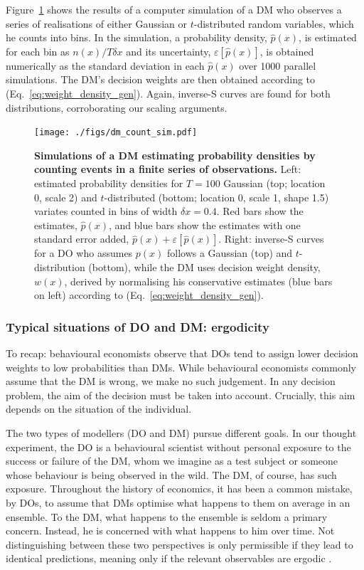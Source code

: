 \documentclass[a4paper, 12pt]{article}
\newcommand{\eref}[1]{(Eq.~\ref{eq:#1})}
\newcommand{\flabel}[1]{\label{fig:#1}}
\newcommand{\Fref}[1]{Figure~\ref{fig:#1}}
\newcommand{\err}[1]{\varepsilon\left[#1\right]}
\newcommand{\phat}{\hat{p}}
\begin{document}
\Fref{dm_count_sim} shows the results of a computer simulation of a DM who observes a series of realisations of either Gaussian or $t$-distributed random variables, which he counts into bins. In the simulation, a probability density, $\phat(x)$, is estimated for each bin as $n(x)/T\delta x$ and its uncertainty, $\err{\phat(x)}$, is obtained numerically as the standard deviation in each $\phat(x)$ over 1000 parallel simulations. The DM's decision weights are then obtained according to \eref{weight_density_gen}. Again, inverse-S curves are found for both distributions, corroborating our scaling arguments.
\begin{figure}[!htb]
\centering
\texttt{[image: ./figs/dm\_count\_sim.pdf]}
\caption{\textbf{Simulations of a DM estimating probability densities by counting events in a finite series of observations.} Left: estimated probability densities for $T=100$ Gaussian (top; location 0, scale 2) and $t$-distributed (bottom; location 0, scale 1, shape 1.5) variates counted in bins of width $\delta x=0.4$. Red bars show the estimates, $\phat(x)$, and blue bars show the estimates with one standard error added, $\phat(x)+\err{\phat(x)}$. Right: inverse-S curves for a DO who assumes $p(x)$ follows a Gaussian (top) and $t$-distribution (bottom), while the DM uses decision weight density, $w(x)$, derived by normalising his conservative estimates (blue bars on left) according to \eref{weight_density_gen}.
}
\flabel{dm_count_sim}
\end{figure}

\subsubsection{Typical situations of DO and DM: ergodicity}
To recap: behavioural economists observe that DOs tend to assign lower decision weights to low probabilities than DMs. While behavioural economists commonly assume that the DM is wrong, we make no such judgement. In any decision problem, the aim of the decision must be taken into account. Crucially, this aim depends on the situation of the individual.

The two types of modellers (DO and DM) pursue different goals. In our thought experiment, the DO is a behavioural scientist without personal exposure to the success or failure of the DM, whom we imagine as a test subject or someone whose behaviour is being observed in the wild. The DM, of course, has such exposure. Throughout the history of economics, it has been a common mistake, by DOs, to assume that DMs optimise what happens to them on average in an ensemble. To the DM, what happens to the ensemble is seldom a primary concern. Instead, he is concerned with what happens to him over time. Not distinguishing between these two perspectives is only permissible if they lead to identical predictions, meaning only if the relevant observables are ergodic \parencite{Peters2019b}.
\end{document}
